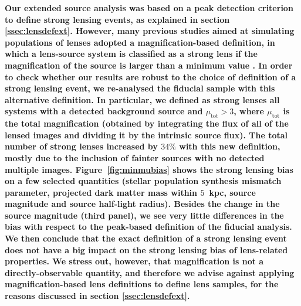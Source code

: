 \documentclass{aa}
\def\Fref#1{Figure~\ref{#1}\xspace}
\begin{document}
{\bf
Our extended source analysis was based on a peak detection criterion to define strong lensing events, as explained in section \ref{ssec:lensdefext}.
However, many previous studies aimed at simulating populations of lenses adopted a magnification-based definition, in which a lens-source system is classified as a strong lens if the magnification of the source is larger than a minimum value \citep[see e.g.][]{Col15, Rob++20}.
In order to check whether our results are robust to the choice of definition of a strong lensing event, we re-analysed the fiducial sample with this alternative definition. %
In particular, we defined as strong lenses all systems with a detected background source and $\mu_{\mathrm{tot}} > 3$, where $\mu_{\mathrm{tot}}$ is the total magnification (obtained by integrating the flux of all of the lensed images and dividing it by the intrinsic source flux).
The total number of strong lenses increased by $34\%$ with this new definition, mostly due to the inclusion of fainter sources with no detected multiple images.
\Fref{fig:minmubias} shows the strong lensing bias on a few selected quantities (stellar population synthesis mismatch parameter, projected dark matter mass within $5$~kpc, source magnitude and source half-light radius).
Besides the change in the source magnitude (third panel), we see very little differences in the bias with respect to the peak-based definition of the fiducial analysis. We then conclude that the exact definition of a strong lensing event does not have a big impact on the strong lensing bias of lens-related properties.
We stress out, however, that magnification is not a directly-observable quantity, and therefore we advise against applying magnification-based lens definitions to define lens samples, for the reasons discussed in section \ref{ssec:lensdefext}.
\begin{figure}

\end{figure}}
\end{document}
